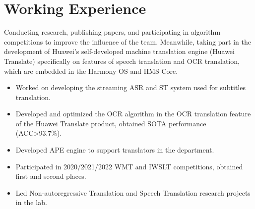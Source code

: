 \documentclass{resume_en}
\begin{document}


 

\section{Working Experience}
Conducting research, publishing papers, and participating in algorithm competitions to improve the influence of the team. Meanwhile, taking part in the development of Huawei's self-developed machine translation engine (Huawei Translate) specifically on features of speech translation and OCR translation, which are embedded in the Harmony OS and HMS Core.
\begin{itemize}
  \item Worked on developing the streaming ASR and ST system used for subtitles translation.
  \item Developed and optimized the OCR algorithm in the OCR translation feature of the Huawei Translate product, obtained SOTA performance (ACC>93.7\%).
  \item Developed APE engine to support translators in the department.
  \item Participated in 2020/2021/2022 WMT and IWSLT competitions, obtained first and second places.
  \item Led Non-autoregressive Translation and Speech Translation research projects in the lab.
\end{itemize}
\end{document}
